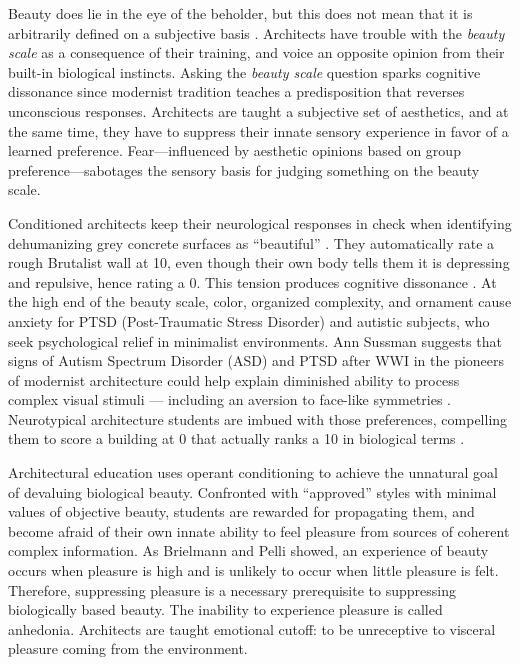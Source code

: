 \documentclass[a4paper]{article}
\begin{document}
Beauty does lie in the eye of the beholder, but this does not mean that it is arbitrarily defined on a subjective basis \cite{norman_introduction_2004}. Architects have trouble with the \textit{beauty scale} as a consequence of their training, and voice an opposite opinion from their built-in biological instincts. Asking the \textit{beauty scale} question sparks cognitive dissonance since modernist tradition teaches a predisposition that reverses unconscious responses. Architects are taught a subjective set of aesthetics, and at the same time, they have to suppress their innate sensory experience in favor of a learned preference. Fear—influenced by aesthetic opinions based on group preference—sabotages the sensory basis for judging something on the beauty scale.

Conditioned architects keep their neurological responses in check when identifying dehumanizing grey concrete surfaces as “beautiful” \cite{curl_duel_2019}. They automatically rate a rough Brutalist wall at 10, even though their own body tells them it is depressing and repulsive, hence rating a 0. This tension produces cognitive dissonance \cite{salingaros_cognitive_2014}. At the high end of the beauty scale, color, organized complexity, and ornament cause anxiety for PTSD (Post-Traumatic Stress Disorder) and autistic subjects, who seek psychological relief in minimalist environments. Ann Sussman suggests that signs of Autism Spectrum Disorder (ASD) and PTSD after WWI in the pioneers of modernist architecture could help explain diminished ability to process complex visual stimuli — including an aversion to face-like symmetries \cite{sussman_eye-tracking_2019, hollander_urban_2020}. Neurotypical architecture students are imbued with those preferences, compelling them to score a building at 0 that actually ranks a 10 in biological terms \cite{salingaros_what_2017,salingaros_theory_2008, salingaros_cognitive_2014}.

Architectural education uses operant conditioning to achieve the unnatural goal of devaluing biological beauty. Confronted with “approved” styles with minimal values of objective beauty, students are rewarded for propagating them, and become afraid of their own innate ability to feel pleasure from sources of coherent complex information. As Brielmann and Pelli \cite{brielmann_intense_2019} showed, an experience of beauty occurs when pleasure is high and is unlikely to occur when little pleasure is felt. Therefore, suppressing pleasure is a necessary prerequisite to suppressing biologically based beauty. The inability to experience pleasure is called anhedonia. Architects are taught emotional cutoff: to be unreceptive to visceral pleasure coming from the environment.
\end{document}
